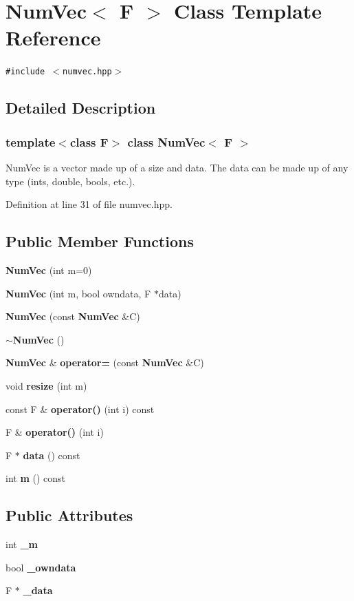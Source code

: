 \section{Num\-Vec$<$ F $>$ Class Template Reference}
\label{classNumVec}
{\tt \#include $<$numvec.hpp$>$}



\subsection{Detailed Description}
\subsubsection*{template$<$class F$>$ class Num\-Vec$<$ F $>$}

Num\-Vec is a vector made up of a size and data. The data can be made up of any type (ints, double, bools, etc.). 



Definition at line 31 of file numvec.hpp.\subsection*{Public Member Functions}
\begin{CompactItemize}
\item 
{\bf Num\-Vec} (int m=0)
\item 
{\bf Num\-Vec} (int m, bool owndata, F $\ast$data)
\item 
{\bf Num\-Vec} (const {\bf Num\-Vec} \&C)
\item 
{\bf $\sim$Num\-Vec} ()
\item 
{\bf Num\-Vec} \& {\bf operator=} (const {\bf Num\-Vec} \&C)
\item 
void {\bf resize} (int m)
\item 
const F \& {\bf operator()} (int i) const 
\item 
F \& {\bf operator()} (int i)
\item 
F $\ast$ {\bf data} () const 
\item 
int {\bf m} () const 
\end{CompactItemize}
\subsection*{Public Attributes}
\begin{CompactItemize}
\item 
int {\bf \_\-m}
\item 
bool {\bf \_\-owndata}
\item 
F $\ast$ {\bf \_\-data}
\end{CompactItemize}


